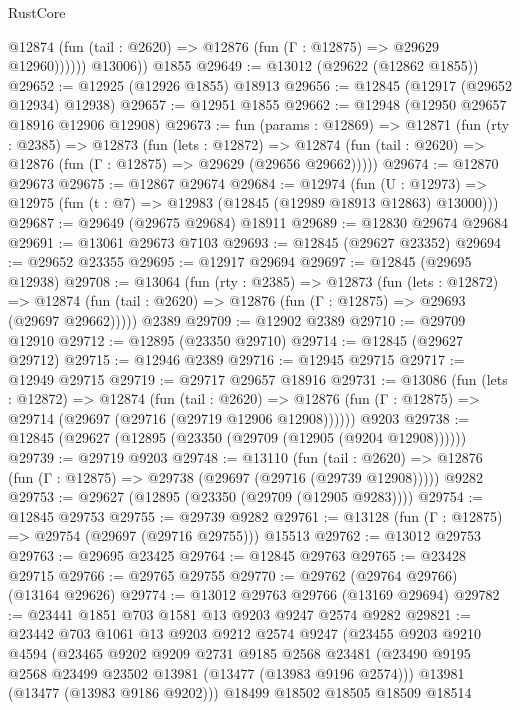 \begin{lexlean}{RustCore}
\begin{coremodule}
              @12874 (fun (tail : @2620) => @12876 (fun (Γ : @12875) => @29629 @12960))))))
        @13006))
    @1855
@29649 := @13012 (@29622 (@12862 @1855))
@29652 := @12925 (@12926 @1855) @18913
@29656 := @12845 (@12917 (@29652 @12934) @12938)
@29657 := @12951 @1855
@29662 := @12948 (@12950 @29657 @18916 @12906 @12908)
@29673 := fun (params : @12869) =>
  @12871
    (fun (rty : @2385) =>
    @12873
      (fun (lets : @12872) =>
      @12874 (fun (tail : @2620) => @12876 (fun (Γ : @12875) => @29629 (@29656 @29662)))))
@29674 := @12870 @29673
@29675 := @12867 @29674
@29684 := @12974
    (fun (U : @12973) => @12975 (fun (t : @7) => @12983 (@12845 (@12989 @18913 @12863) @13000)))
@29687 := @29649 (@29675 @29684) @18911
@29689 := @12830 @29674 @29684
@29691 := @13061 @29673 @7103
@29693 := @12845 (@29627 @23352)
@29694 := @29652 @23355
@29695 := @12917 @29694
@29697 := @12845 (@29695 @12938)
@29708 := @13064
    (fun (rty : @2385) =>
    @12873
      (fun (lets : @12872) =>
      @12874 (fun (tail : @2620) => @12876 (fun (Γ : @12875) => @29693 (@29697 @29662)))))
    @2389
@29709 := @12902 @2389
@29710 := @29709 @12910
@29712 := @12895 (@23350 @29710)
@29714 := @12845 (@29627 @29712)
@29715 := @12946 @2389
@29716 := @12945 @29715
@29717 := @12949 @29715
@29719 := @29717 @29657 @18916
@29731 := @13086
    (fun (lets : @12872) =>
    @12874
      (fun (tail : @2620) =>
      @12876 (fun (Γ : @12875) => @29714 (@29697 (@29716 (@29719 @12906 @12908))))))
    @9203
@29738 := @12845 (@29627 (@12895 (@23350 (@29709 (@12905 (@9204 @12908))))))
@29739 := @29719 @9203
@29748 := @13110
    (fun (tail : @2620) => @12876 (fun (Γ : @12875) => @29738 (@29697 (@29716 (@29739 @12908)))))
    @9282
@29753 := @29627 (@12895 (@23350 (@29709 (@12905 @9283))))
@29754 := @12845 @29753
@29755 := @29739 @9282
@29761 := @13128 (fun (Γ : @12875) => @29754 (@29697 (@29716 @29755))) @15513
@29762 := @13012 @29753
@29763 := @29695 @23425
@29764 := @12845 @29763
@29765 := @23428 @29715
@29766 := @29765 @29755
@29770 := @29762 (@29764 @29766) (@13164 @29626)
@29774 := @13012 @29763 @29766 (@13169 @29694)
@29782 := @23441 @1851 @703 @1581 @13 @9203 @9247 @2574 @9282
@29821 := @23442
    @703
    @1061
    @13
    @9203
    @9212
    @2574
    @9247
    (@23455
      @9203
      @9210
      @4594
      (@23465
        @9202
        @9209
        @2731
        @9185
        @2568
        @23481
        (@23490 @9195 @2568 @23499 @23502 @13981 (@13477 (@13983 @9196 @2574)))
        @13981
        (@13477 (@13983 @9186 @9202)))
      @18499
      @18502
      @18505
      @18509
      @18514

\end{coremodule}
\end{lexlean}
